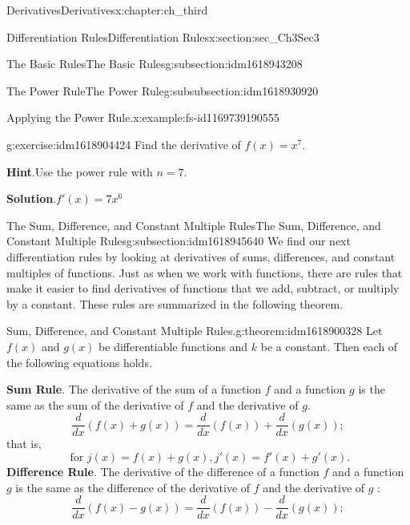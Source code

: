 \documentclass[oneside,10pt,]{book}
\newcommand{\blocktitlefont}{\relax}
\newcommand{\terminology}[1]{\textbf{#1}}
\numberwithin{equation}{section}
\begin{document}
\begin{chapterptx}{Derivatives}{}{Derivatives}{}{}{x:chapter:ch_third}
\begin{sectionptx}{Differentiation Rules}{}{Differentiation Rules}{}{}{x:section:sec_Ch3Sec3}
\begin{subsectionptx}{The Basic Rules}{}{The Basic Rules}{}{}{g:subsection:idm1618943208}
\begin{subsubsectionptx}{The Power Rule}{}{The Power Rule}{}{}{g:subsubsection:idm1618930920}
\begin{example}{Applying the Power Rule.}{x:example:fs-id1169739190555}
\end{example}
\begin{inlineexercise}{}{g:exercise:idm1618904424}%
Find the derivative of \(f(x)=x^7.\)%
\par\smallskip%
\noindent\textbf{\blocktitlefont Hint}.\hypertarget{g:hint:idm1618904808}{}\quad{}Use the power rule with \(n=7.\)%
\par\smallskip%
\noindent\textbf{\blocktitlefont Solution}.\hypertarget{g:solution:idm1618904168}{}\quad{}\(f'(x)=7x^6\)%
\end{inlineexercise}%
\end{subsubsectionptx}
\end{subsectionptx}
%
%
\typeout{************************************************}
\typeout{************************************************}
%
\begin{subsectionptx}{The Sum, Difference, and Constant Multiple Rules}{}{The Sum, Difference, and Constant Multiple Rules}{}{}{g:subsection:idm1618945640}
We find our next differentiation rules by looking at derivatives of sums, differences, and constant multiples of functions. Just as when we work with functions, there are rules that make it easier to find derivatives of functions that we add, subtract, or multiply by a constant. These rules are summarized in the following theorem.%
\begin{theorem}{Sum, Difference, and Constant Multiple Rules.}{}{g:theorem:idm1618900328}%
Let \(f(x)\) and \(g(x)\) be differentiable functions and \(k\) be a constant. Then each of the following equations holds.%
\par
\terminology{Sum Rule}. The derivative of the sum of a function \(f\) and a function \(g\) is the same as the sum of the derivative of \(f\) and the derivative of \(g.\)%
%
\begin{equation*}
\frac{d}{dx}(f(x)+g(x))=\frac{d}{dx}(f(x))+\frac{d}{dx}(g(x));
\end{equation*}
that is,%
%
\begin{equation*}
\text{ for } j(x)=f(x)+g(x),j'(x)=f'(x)+g'(x).
\end{equation*}
\terminology{Difference Rule}. The derivative of the difference of a function \(f\) and a function \(g\) is the same as the difference of the derivative of \(f\) and the derivative of \(g\text{ : }\)%
%
\begin{equation*}
\frac{d}{dx}(f(x)-g(x))=\frac{d}{dx}(f(x))-\frac{d}{dx}(g(x));
\end{equation*}

\end{theorem}
\end{subsectionptx}
\end{sectionptx}
\end{chapterptx}
\end{document}
